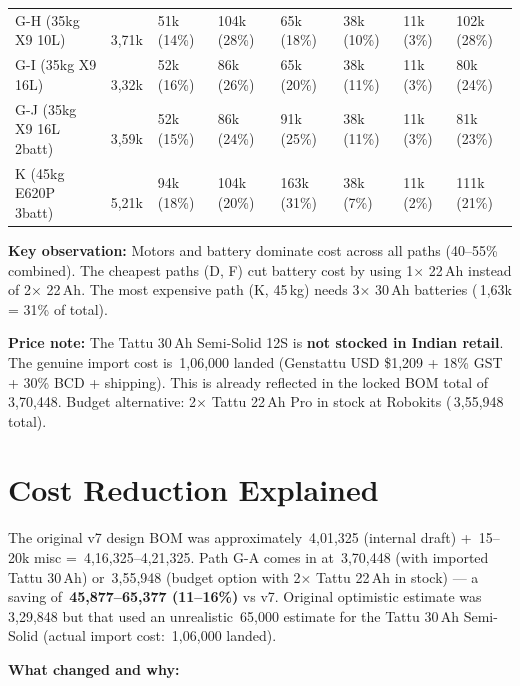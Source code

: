 \documentclass[11pt,a4paper]{article}
\newcommand{\Rs}{\rupee\,}
\begin{document}
\begin{landscape}
\begin{xltabular}{\linewidth}{@{}L{2.4cm}R{1.5cm}R{1.2cm}R{1.2cm}R{1.2cm}R{1.2cm}R{1.2cm}R{1.2cm}@{}}
G-H (35kg X9 10L) & \Rs{}3,71k & 51k (14\%)  & 104k (28\%) & 65k (18\%)  & 38k (10\%)  & 11k (3\%)  & 102k (28\%) \\
G-I (35kg X9 16L)    & \Rs{}3,32k & 52k (16\%)  & 86k (26\%)  & 65k (20\%)  & 38k (11\%)  & 11k (3\%)  & 80k (24\%)  \\
G-J (35kg X9 16L 2batt) & \Rs{}3,59k & 52k (15\%)  & 86k (24\%)  & 91k (25\%)  & 38k (11\%)  & 11k (3\%)  & 81k (23\%)  \\
K  (45kg E620P 3batt) & \Rs{}5,21k & 94k (18\%)  & 104k (20\%) & 163k (31\%) & 38k (7\%)   & 11k (2\%)  & 111k (21\%) \\
\bottomrule
\end{xltabular}
\end{landscape}

\noindent\textbf{Key observation:} Motors and battery dominate cost across all paths (40--55\% combined). The cheapest paths (D, F) cut battery cost by using 1$\times$ 22\,Ah instead of 2$\times$ 22\,Ah. The most expensive path (K, 45\,kg) needs 3$\times$ 30\,Ah batteries (\Rs{}1,63k = 31\% of total).

\noindent\textbf{Price note:} The Tattu 30\,Ah Semi-Solid 12S is \textbf{not stocked in Indian retail}. The genuine import cost is \Rs{}1,06,000 landed (Genstattu USD \$1,209 + 18\% GST + 30\% BCD + shipping). This is already reflected in the locked BOM total of \Rs{}3,70,448. Budget alternative: 2$\times$ Tattu 22\,Ah Pro in stock at Robokits (\Rs{}3,55,948 total).

\section{Cost Reduction Explained}

The original v7 design BOM was approximately \Rs{}4,01,325 (internal draft) + \Rs{}15--20k misc = \Rs{}4,16,325--4,21,325. Path G-A comes in at \Rs{}3,70,448 (with imported Tattu 30\,Ah) or \Rs{}3,55,948 (budget option with 2$\times$ Tattu 22\,Ah in stock) --- a saving of \textbf{\Rs{}45,877--65,377 (11--16\%)} vs v7. Original optimistic estimate was \Rs{}3,29,848 but that used an unrealistic \Rs{}65,000 estimate for the Tattu 30\,Ah Semi-Solid (actual import cost: \Rs{}1,06,000 landed).

\textbf{What changed and why:}
\end{document}
